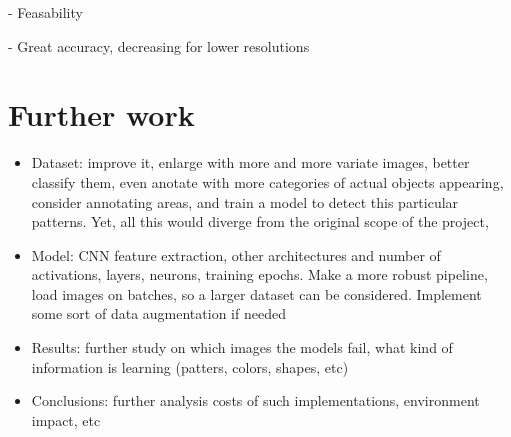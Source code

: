 - Feasability

- Great accuracy, decreasing for lower resolutions

\section{Further work}

\begin{itemize}
	\item Dataset: improve it, enlarge with more and more variate images, better classify them, even anotate with more categories of actual objects appearing, consider annotating areas, and train a model to detect this particular patterns. Yet, all this would diverge from the original scope of the project,
	\item Model: CNN feature extraction, other architectures and number of activations, layers, neurons, training epochs. Make a more robust pipeline, load images on batches, so a larger dataset can be considered. Implement some sort of data augmentation if needed
	\item Results: further study on which images the models fail, what kind of information is learning (patters, colors, shapes, etc)
	\item Conclusions: further analysis costs of such implementations, environment impact, etc
\end{itemize}
